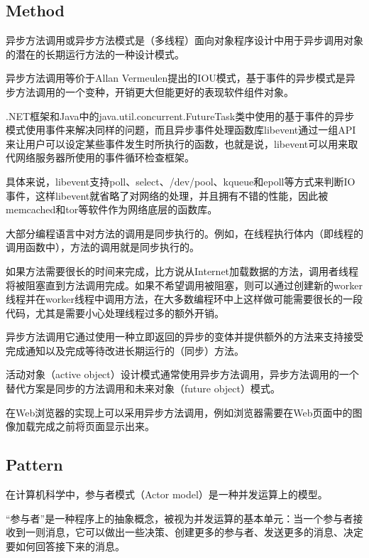\subsection{Method}

异步方法调用或异步方法模式是（多线程）面向对象程序设计中用于异步调用对象的潜在的长期运行方法的一种设计模式。

异步方法调用等价于Allan Vermeulen提出的IOU模式，基于事件的异步模式是异步方法调用的一个变种，开销更大但能更好的表现软件组件对象。

.NET框架和Java中的java.util.concurrent.FutureTask类中使用的基于事件的异步模式使用事件来解决同样的问题，而且异步事件处理函数库libevent通过一组API来让用户可以设定某些事件发生时所执行的函数，也就是说，libevent可以用来取代网络服务器所使用的事件循环检查框架。



具体来说，libevent支持poll、select、/dev/pool、kqueue和epoll等方式来判断IO事件，这样libevent就省略了对网络的处理，并且拥有不错的性能，因此被memcached和tor等软件作为网络底层的函数库。

大部分编程语言中对方法的调用是同步执行的。例如，在线程执行体内（即线程的调用函数中），方法的调用就是同步执行的。

如果方法需要很长的时间来完成，比方说从Internet加载数据的方法，调用者线程将被阻塞直到方法调用完成。如果不希望调用被阻塞，则可以通过创建新的worker线程并在worker线程中调用方法，在大多数编程环中上这样做可能需要很长的一段代码，尤其是需要小心处理线程过多的额外开销。

异步方法调用它通过使用一种立即返回的异步的变体并提供额外的方法来支持接受完成通知以及完成等待改进长期运行的（同步）方法。

活动对象（active object）设计模式通常使用异步方法调用，异步方法调用的一个替代方案是同步的方法调用和未来对象（future object）模式。



在Web浏览器的实现上可以采用异步方法调用，例如浏览器需要在Web页面中的图像加载完成之前将页面显示出来。


\subsection{Pattern}

在计算机科学中，参与者模式（Actor model）是一种并发运算上的模型。

“参与者”是一种程序上的抽象概念，被视为并发运算的基本单元：当一个参与者接收到一则消息，它可以做出一些决策、创建更多的参与者、发送更多的消息、决定要如何回答接下来的消息。

